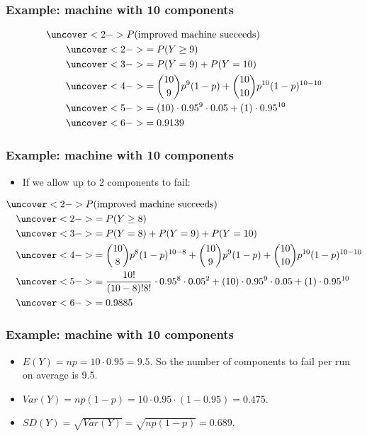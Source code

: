 \documentclass[handout]{beamer}\usepackage[]{graphicx}\usepackage[]{color}
\numberwithin{equation}{section}
\begin{document}
\begin{frame}
\frametitle{Example: machine with 10 components}

\begin{align*}
&\uncover<2->{P(\text{improved machine succeeds)}} \\
& \qquad \uncover<2->{= P(Y \ge 9)} \\
&\qquad \uncover<3->{= P(Y = 9) + P(Y = 10)} \\
&\qquad  \uncover<4->{=\binom{10}{9}p^9 (1-p) + \binom{10}{10} p^{10} (1-p)^{10 - 10}} \\
&\qquad \uncover<5->{=(10) \cdot 0.95^9 \cdot 0.05 + (1) \cdot 0.95^{10}} \\
&\qquad \uncover<6->{= 0.9139}
\end{align*}
\begin{itemize}
\end{itemize}

\end{frame}\begin{frame}
\frametitle{Example: machine with 10 components}
\begin{itemize}
\item If we allow up to 2 components to fail:
\end{itemize}
\small
\begin{align*}
&\uncover<2->{P(\text{improved machine succeeds)}} \\
& \quad \uncover<2->{= P(Y \ge 8)} \\
&\quad \uncover<3->{= P(Y = 8) + P(Y = 9) + P(Y = 10)} \\
&\quad  \uncover<4->{=\binom{10}{8} p^8 (1-p)^{10 - 8} + \binom{10}{9}p^9 (1-p) + \binom{10}{10} p^{10} (1-p)^{10 - 10}} \\
&\quad \uncover<5->{=\frac{10!}{(10-8)!8!} \cdot 0.95^8 \cdot 0.05^2 + (10) \cdot 0.95^9 \cdot 0.05 + (1) \cdot 0.95^{10}} \\
&\quad \uncover<6->{= 0.9885}
\end{align*}


\end{frame}
\begin{frame}
\frametitle{Example: machine with 10 components}

\begin{itemize}
 \item $E(Y) = np = 10 \cdot 0.95 = 9.5$. So the number of components to fail per run on average is 9.5.
\pause \item $Var(Y) = np(1-p) = 10 \cdot 0.95 \cdot (1- 0.95) = 0.475$.
\pause \item $SD(Y) = \sqrt{Var(Y)} = \sqrt{np(1-p)}  =0.689$. 
\end{itemize}

\end{frame}
\end{document}
